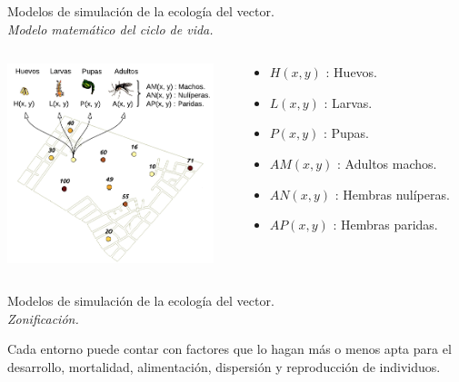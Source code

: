 \begin{frame}[c]{Modelos de simulación de la ecología del vector.\\\textit{Modelo matemático del ciclo de vida.}}
  \begin{center}
   \begin{columns}[T]
        \begin{column}[T]{6cm}
            \includegraphics[width=6cm]{./graphics/modelado-poblacion.png}
        \end{column}
        \begin{column}[T]{5.5cm}
          \begin{itemize}
            \item $H(x, y)$ : Huevos.
            \item $L(x, y)$ : Larvas.
            \item $P(x, y)$ : Pupas.
            \item $AM(x, y)$ : Adultos machos.
            \item $AN(x, y)$ : Hembras nulíperas.
            \item $AP(x, y)$ : Hembras paridas.
          \end{itemize}
        \end{column}
    \end{columns}
  \end{center}
\end{frame}


\begin{frame}[c]{Modelos de simulación de la ecología del vector.\\\textit{Zonificación.}}
  \begin{center}
    Cada entorno puede contar con factores que lo hagan más o menos apta para el desarrollo, mortalidad, alimentación, dispersión y reproducción de individuos.
  \end{center}
\end{frame}

